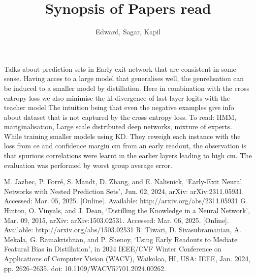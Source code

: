 \documentclass{article}
\begin{document}
\title{Synopsis of Papers read}
\author{Edward, Sagar, Kapil}
\maketitle

\cite{MJaz+24} Talks about prediction sets in Early exit network that are consistent in some sense.
\cite{GH+15} Having acces to a large model that generalises well, the genrelisation can be 
induced to a smaller model by distillation. Here in combination with the cross entropy loss we also minimise the 
kl divergence of last layer logits with the teacher model
The intuition being that even the negative examples give info about dataset that is not captured by the cross entropy loss.
To read: HMM, mariginalisation, Large scale distributed deep networks, mixture of experts.
\cite{Tiw+24} While training smaller models using KD. They reweigh each instance with the loss from ce and confidence margin 
cm from an early readout, the observation is that spurious correlations were learnt in the earlier layers leading to high 
cm. The evaluation was performed by worst group average error. 



\begin{thebibliography}{99}
    M. Jazbec, P. Forré, S. Mandt, D. Zhang, and E. Nalisnick, 
    ‘Early-Exit Neural Networks with Nested Prediction Sets’, Jun. 02, 2024, 
    arXiv: arXiv:2311.05931. Accessed: Mar. 05, 2025. [Online]. Available: http://arxiv.org/abs/2311.05931
    G. Hinton, O. Vinyals, and J. Dean, ‘Distilling the Knowledge in a Neural Network’, 
    Mar. 09, 2015, arXiv: arXiv:1503.02531. Accessed: Mar. 06, 2025. 
    [Online]. Available: http://arxiv.org/abs/1503.02531
    R. Tiwari, D. Sivasubramanian, A. Mekala, G. Ramakrishnan, and P. Shenoy, 
    ‘Using Early Readouts to Mediate Featural Bias in Distillation’, 
    in 2024 IEEE/CVF Winter Conference on Applications of Computer Vision (WACV),
    Waikoloa, HI, USA: IEEE, Jan. 2024, pp. 2626–2635. doi: 10.1109/WACV57701.2024.00262.



\end{thebibliography}
\end{document}

